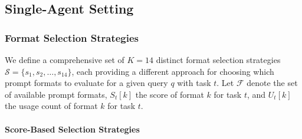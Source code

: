 
\subsection{Single-Agent Setting}\label{appendix_single_agent}

\subsubsection{Format Selection Strategies}

We define a comprehensive set of $K = 14$ distinct format selection strategies $\mathcal{S} = \{s_1, s_2, \ldots, s_{14}\}$, each providing a different approach for choosing which prompt formats to evaluate for a given query $q$ with task $t$. Let $\mathcal{F}$ denote the set of available prompt formats, $S_t[k]$ the score of format $k$ for task $t$, and $U_t[k]$ the usage count of format $k$ for task $t$.

\paragraph{Score-Based Selection Strategies}

